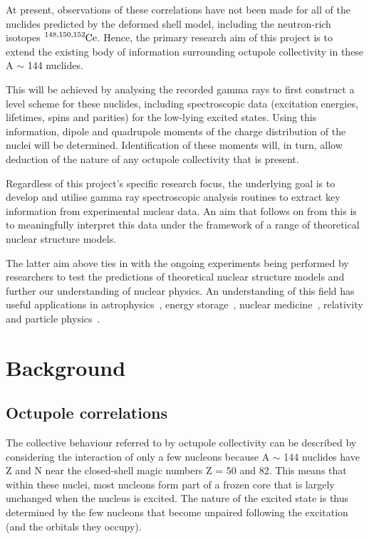 \documentclass[12pt,a4paper]{article}
\begin{document}
\medskip
\noindent
At present, observations of these correlations have not been made for all of the nuclides predicted by the deformed shell model, including the neutron-rich isotopes $\ce{^{148,150,152}Ce}$.
Hence, the primary research aim of this project is to extend the existing body of information surrounding octupole collectivity in these A $\sim$ 144 nuclides.

\medskip
\noindent
This will be achieved by analysing the recorded gamma rays to first construct a level scheme for these nuclides, including spectroscopic data (excitation energies, lifetimes, spins and parities) for the low-lying excited states.
Using this information, dipole and quadrupole moments of the charge distribution of the nuclei will be determined.
Identification of these moments will, in turn, allow deduction of the nature of any octupole collectivity that is present.%

\medskip
\noindent
Regardless of this project's specific research focus, the underlying goal is to develop and utilise gamma ray spectroscopic analysis routines to extract key information from experimental nuclear data.
An aim that follows on from this is to meaningfully interpret this data under the framework of a range of theoretical nuclear structure models.

\medskip
\noindent
The latter aim above ties in with the ongoing experiments being performed by researchers to test the predictions of theoretical nuclear structure models and further our understanding of nuclear physics.
An understanding of this field has useful applications in astrophysics~\cite{hayakawa_neutron_2009}, energy storage~\cite{shaffer_innovations_2018}, nuclear medicine~\cite{krane_introductory_1987}, relativity and particle physics~\cite{casten_nuclear_1990}.



\section*{Background}

\subsection*{Octupole correlations}
The collective behaviour referred to by octupole collectivity can be described by considering the interaction of only a few nucleons because A $\sim$ 144 nuclides have Z and N near the closed-shell magic numbers Z = 50 and 82.
This means that within these nuclei, most nucleons form part of a frozen core that is largely unchanged when the nucleus is excited.
The nature of the excited state is thus determined by the few nucleons that become unpaired following the excitation (and the orbitals they occupy).
\end{document}

